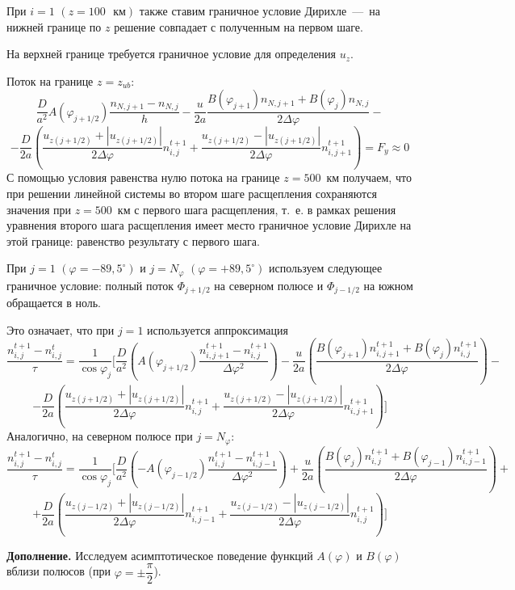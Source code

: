 \documentclass[2pt, a4paper, fleqn]{extarticle}
\begin{document}
При $i = 1$ $(z = 100\mbox{ } \mbox{км})$ также ставим граничное условие Дирихле~---~на нижней границе по $z$ решение совпадает с полученным на первом шаге.

На верхней границе требуется граничное условие для определения $u_z$.

Поток на границе $z=z_{ub}$: $$\dfrac{D}{a^2}A(\varphi_{j+1/2})\dfrac{n_{N, j+1}-n_{N, j}}{h}-\dfrac{u}{2a}\dfrac{B(\varphi_{j+1})n_{N, j+1}+B(\varphi_j)n_{N, j}}{2\Delta\varphi}-$$ $$-\dfrac{D}{2a}\left(\dfrac{u_{z(j+1/2)}+|u_{z(j+1/2)}|}{2\Delta\varphi}n_{i,j}^{t+1}+\dfrac{u_{z(j+1/2)}-|u_{z(j+1/2)}|}{2\Delta\varphi} n_{i,j+1}^{t+1}\right) = F_{y}\approx 0$$
С помощью условия равенства нулю потока на границе $z = 500$~км получаем, что при решении линейной системы во втором шаге расщепления сохраняются значения при $z = 500$~км с первого шага расщепления, т.~е. в рамках решения уравнения второго шага расщепления имеет место граничное условие Дирихле на этой границе: равенство результату с первого шага.

При $j = 1$ $(\varphi = -89{,}5^\circ)$ и $j = N_\varphi$ $(\varphi = +89{,}5^\circ)$ используем следующее граничное условие: полный поток $\Phi_{j+1/2}$ на северном полюсе и $\Phi_{j-1/2}$ на южном обращается в ноль.

Это означает, что при $j = 1$ используется аппроксимация $$\dfrac{n_{i,j}^{t+1}-n_{i,j}^t}{\tau} = \dfrac{1}{\cos\varphi_j} \bigg[\dfrac{D}{a^2}\left(A(\varphi_{j+1/2})\dfrac{n_{i, j+1}^{t+1}-n_{i,j}^{t+1}}{\Delta\varphi^2}\right)-\dfrac{u}{2a}\left(\dfrac{B(\varphi_{j+1})n_{i,j+1}^{t+1}+B(\varphi_{j})n_{i,j}^{t+1}}{2\Delta\varphi}\right) -$$ $$- \dfrac{D}{2a}\left(\dfrac{u_{z(j+1/2)}+|u_{z(j+1/2)}|}{2\Delta\varphi}n_{i,j}^{t+1}+\dfrac{u_{z(j+1/2)}-|u_{z(j+1/2)}|}{2\Delta\varphi} n_{i,j+1}^{t+1}\right) \bigg]$$
Аналогично, на северном полюсе при $j=N_\varphi$: $$\dfrac{n_{i,j}^{t+1}-n_{i,j}^t}{\tau} = \dfrac{1}{\cos\varphi_j} \bigg[\dfrac{D}{a^2}\left(-A(\varphi_{j-1/2})\dfrac{n_{i,j}^{t+1}-n_{i,j-1}^{t+1}}{\Delta\varphi^2}\right)+\dfrac{u}{2a}\left(\dfrac{B(\varphi_{j})n_{i,j}^{t+1}+B(\varphi_{j-1})n_{i,j-1}^{t+1}}{2\Delta\varphi}\right) +$$ $$+ \dfrac{D}{2a}\left(\dfrac{u_{z(j-1/2)}+|u_{z(j-1/2)}|}{2\Delta\varphi}n_{i,j-1}^{t+1}+\dfrac{u_{z(j-1/2)}-|u_{z(j-1/2)}|}{2\Delta\varphi} n_{i,j}^{t+1}\right) \bigg]$$

\bigskip

{\bf Дополнение.} Исследуем асимптотическое поведение функций $A(\varphi)$ и $B(\varphi)$ вблизи полюсов (при $\varphi = \pm\dfrac{\pi}{2}$).
\end{document}
